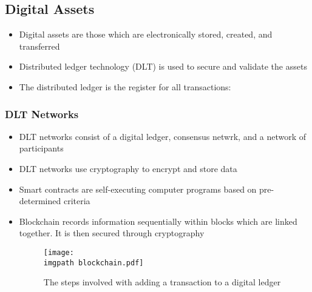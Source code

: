 \documentclass[../notes_compiled.tex]{subfiles}
\begin{document}
\subsection{Digital Assets}
\begin{itemize}
\item Digital assets are those which are electronically stored, created, and transferred
\item Distributed ledger technology (DLT) is used to secure and validate the assets
\item The distributed ledger is the register for all transactions:
\end{itemize}

\subsubsection{DLT Networks}
\begin{itemize}
\item DLT networks consist of a digital ledger, consensus netwrk, and a network of participants
\item DLT networks use cryptography to encrypt and store data
\item Smart contracts are self-executing computer programs based on pre-determined criteria
\item Blockchain records information sequentially within blocks which are linked together. It is then secured through cryptography
\vspace{-.4cm}
\begin{figure}[h]
  \centering
  \texttt{[image: \\imgpath blockchain.pdf]}
  \caption{The steps involved with adding a transaction to a digital ledger}
\end{figure}
\end{itemize}
\vspace{-1cm}
\end{document}

